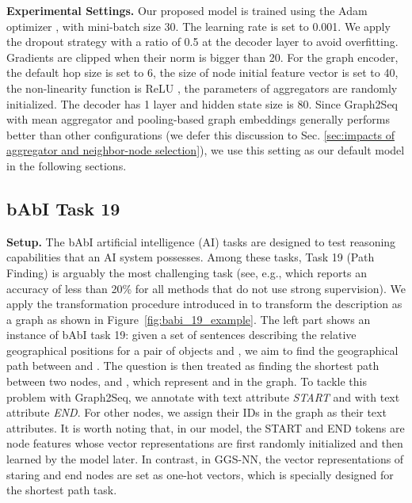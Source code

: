 \documentclass{article} \usepackage{iclr2019_conference,times}
\begin{document}
\textbf{Experimental Settings.}
Our proposed model is trained using the Adam optimizer \citep{DBLP:journals/corr/KingmaB14},
with mini-batch size 30. The learning rate is set to 0.001.
We apply the dropout strategy \citep{DBLP:journals/jmlr/SrivastavaHKSS14} with a ratio of 0.5 at the decoder layer to avoid overfitting.
Gradients are clipped when their norm is bigger than 20.
For the graph encoder,
the default hop size  is set to 6, 
the size of node initial feature vector is set to 40,
the non-linearity function  is ReLU \citep{DBLP:journals/jmlr/GlorotBB11},
the parameters of aggregators are randomly initialized.
The decoder has 1 layer and hidden state size is 80. 
Since Graph2Seq with mean aggregator and pooling-based graph embeddings generally performs better than other configurations (we defer this discussion to Sec. \ref{sec:impacts of aggregator and neighbor-node selection}), we use this setting as our default model in the following sections.  



\subsection{bAbI Task 19}
\textbf{Setup.} The bAbI artificial intelligence (AI) tasks \citep{DBLP:journals/corr/WestonBCM15} are designed to test reasoning capabilities that an AI system possesses.
Among these tasks, Task 19 (Path Finding) is arguably the most challenging task (see, e.g., \citep{DBLP:conf/nips/SukhbaatarSWF15} which reports an accuracy of less than 20\% for all methods that do not use strong supervision). We apply the transformation procedure introduced in \citep{li2015gated} to transform the description as a graph as shown in Figure~\ref{fig:babi_19_example}. The left part shows an instance of bAbI task 19: given a set of sentences describing the relative geographical positions for a pair of objects  and , we aim to find the geographical path between  and . The question is then treated as finding the shortest path between two nodes,  and , which represent  and  in the graph. To tackle this problem with Graph2Seq, we annotate  with text attribute \textit{START} and  with text attribute \textit{END}. For other nodes, we assign their IDs in the graph as their text attributes. It is worth noting that, in our model, the START and END tokens are node features whose vector representations are first randomly initialized and then learned by the model later. In contrast, in GGS-NN, the vector representations of staring and end nodes are set as one-hot vectors, which is specially designed for the shortest path task.
\end{document}
